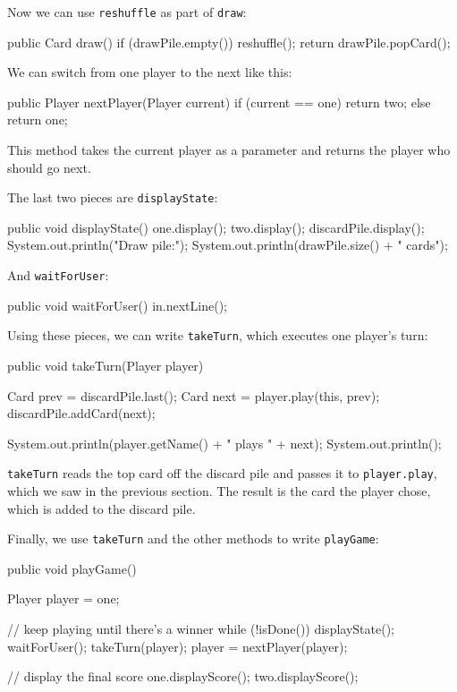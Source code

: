 \documentclass[12pt]{book}
\theoremstyle{exercise}
\newcommand{\java}[1]{\verb"#1"}
\begin{document}
Now we can use \java{reshuffle} as part of \java{draw}:

\begin{code}
    public Card draw() {
        if (drawPile.empty()) {
            reshuffle();
        }
        return drawPile.popCard();
    }
\end{code}


We can switch from one player to the next like this:

\begin{code}
    public Player nextPlayer(Player current) {
        if (current == one) {
            return two;
        } else {
            return one;
        }
    }
\end{code}

This method takes the current player as a parameter and returns the player who should go next.

The last two pieces are \java{displayState}:

\begin{code}
    public void displayState() {
        one.display();
        two.display();
        discardPile.display();
        System.out.println("Draw pile:");
        System.out.println(drawPile.size() + " cards");
    }
\end{code}

And \java{waitForUser}:

\begin{code}
    public void waitForUser() {
        in.nextLine();
    }
\end{code}

Using these pieces, we can write \java{takeTurn}, which executes one player's turn:

\begin{code}
    public void takeTurn(Player player) {
        Card prev = discardPile.last();
        Card next = player.play(this, prev);
        discardPile.addCard(next);

        System.out.println(player.getName() + " plays " + next);
        System.out.println();
    }
\end{code}

\java{takeTurn} reads the top card off the discard pile and passes it to \java{player.play}, which we saw in the previous section.
The result is the card the player chose, which is added to the discard pile.

Finally, we use \java{takeTurn} and the other methods to write \java{playGame}:

\begin{code}
    public void playGame() {
        Player player = one;

        // keep playing until there's a winner
        while (!isDone()) {
            displayState();
            waitForUser();
            takeTurn(player);
            player = nextPlayer(player);
        }

        // display the final score
        one.displayScore();
        two.displayScore();
    }
\end{code}
\end{document}
